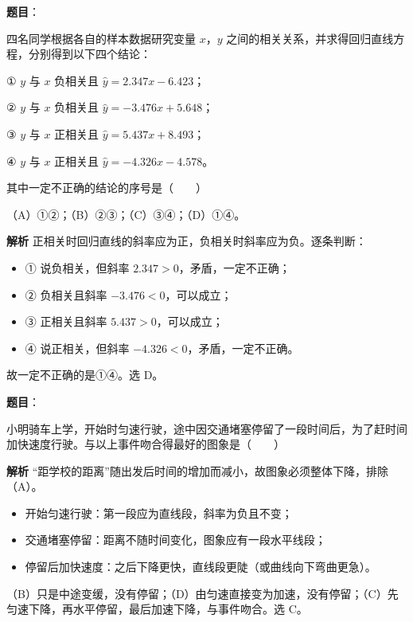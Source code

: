 \begin{answer}

\textbf{题目}：

四名同学根据各自的样本数据研究变量 $x$，$y$ 之间的相关关系，并求得回归直线方程，分别得到以下四个结论：

① $y$ 与 $x$ 负相关且 $\hat y=2.347x-6.423$；

② $y$ 与 $x$ 负相关且 $\hat y=-3.476x+5.648$；

③ $y$ 与 $x$ 正相关且 $\hat y=5.437x+8.493$；

④ $y$ 与 $x$ 正相关且 $\hat y=-4.326x-4.578$。

其中一定不正确的结论的序号是\mbox{（　　）}

（A）①②；（B）②③；（C）③④；（D）①④。

\textbf{解析}
正相关时回归直线的斜率应为正，负相关时斜率应为负。逐条判断：

\begin{itemize}
\item ① 说负相关，但斜率 $2.347>0$，矛盾，一定不正确；
\item ② 负相关且斜率 $-3.476<0$，可以成立；
\item ③ 正相关且斜率 $5.437>0$，可以成立；
\item ④ 说正相关，但斜率 $-4.326<0$，矛盾，一定不正确。
\end{itemize}

故一定不正确的是①④。选 D。


\end{answer}
\begin{answer}

\textbf{题目}：

小明骑车上学，开始时匀速行驶，途中因交通堵塞停留了一段时间后，为了赶时间加快速度行驶。与以上事件吻合得最好的图象是\mbox{（　　）}
\nopagebreak[4]
\begin{center}\end{center}
\nopagebreak[4]
\textbf{解析}
“距学校的距离”随出发后时间的增加而减小，故图象必须整体下降，排除（A）。

\begin{itemize}
\item 开始匀速行驶：第一段应为直线段，斜率为负且不变；
\item 交通堵塞停留：距离不随时间变化，图象应有一段水平线段；
\item 停留后加快速度：之后下降更快，直线段更陡（或曲线向下弯曲更急）。
\end{itemize}

（B）只是中途变缓，没有停留；（D）由匀速直接变为加速，没有停留；（C）先匀速下降，再水平停留，最后加速下降，与事件吻合。选 C。


\end{answer}
